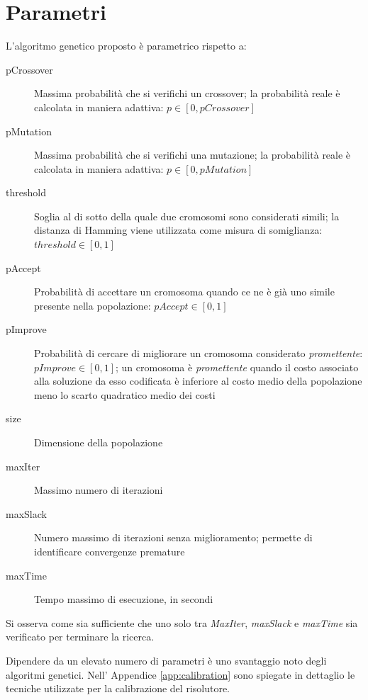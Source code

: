 \documentclass[a4paper, 10pt]{report}
\begin{document}
\section{Parametri}
\label{sec:ga_parameters}
L'algoritmo genetico proposto è parametrico rispetto a:
\begin{description}
  \item [pCrossover] Massima probabilità che si verifichi un crossover;
  la probabilità reale è calcolata in maniera adattiva: $p \in [0, pCrossover]$
  
  \item [pMutation] Massima probabilità che si verifichi una mutazione;
  la probabilità reale è calcolata in maniera adattiva: $p \in [0, pMutation]$
  
  \item [threshold] Soglia al di sotto della quale due cromosomi sono
  considerati simili; la distanza di Hamming viene utilizzata come misura
  di somiglianza: $threshold \in [0, 1]$
  
  \item [pAccept] Probabilità di accettare un cromosoma quando ce ne è
  già uno simile presente nella popolazione: $pAccept \in [0, 1]$
  
  \item [pImprove] Probabilità di cercare di migliorare un cromosoma
  considerato \emph{promettente}: $pImprove \in [0, 1]$; un cromosoma è
  \emph{promettente} quando il costo associato alla soluzione da esso
  codificata è inferiore al costo medio della popolazione meno lo scarto
  quadratico medio dei costi
  
  \item [size] Dimensione della popolazione
  
  \item [maxIter] Massimo numero di iterazioni
  
  \item [maxSlack] Numero massimo di iterazioni senza miglioramento;
  permette di identificare convergenze premature
  
  \item [maxTime] Tempo massimo di esecuzione, in secondi
\end{description}

Si osserva come sia sufficiente che uno solo tra \emph{MaxIter},
\emph{maxSlack} e \emph{maxTime} sia verificato per terminare la ricerca.

Dipendere da un elevato numero di parametri è uno svantaggio noto degli
algoritmi genetici. Nell' Appendice \ref{app:calibration} sono spiegate
in dettaglio le tecniche utilizzate per la calibrazione del risolutore.
\end{document}
